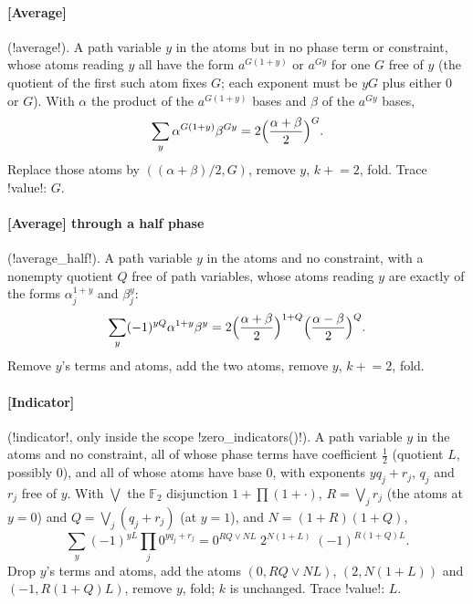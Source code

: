 \paragraph{[Average]} (\code!average!). A path variable $y$ in the atoms but in no phase term or constraint, whose atoms reading $y$ all have the form $a^{G(1+y)}$ or $a^{Gy}$ for one $G$ free of $y$ (the quotient of the first such atom fixes $G$; each exponent must be $yG$ plus either $0$ or $G$). With $\alpha$ the product of the $a^{G(1+y)}$ bases and $\beta$ of the $a^{Gy}$ bases,
\begin{equation}
\sum_y\alpha^{G(1+y)}\beta^{Gy}=2\Bigl(\frac{\alpha+\beta}2\Bigr)^{G}.
\end{equation}
Replace those atoms by $((\alpha+\beta)/2,G)$, remove $y$, $k\mathrel{+}=2$, fold. Trace \code!value!: $G$.

\paragraph{[Average] through a half phase} (\code!average_half!). A path variable $y$ in the atoms and no constraint, with a nonempty quotient $Q$ free of path variables, whose atoms reading $y$ are exactly of the forms $\alpha_j^{1+y}$ and $\beta_j^{y}$:
\begin{equation}
\sum_y(-1)^{yQ}\alpha^{1+y}\beta^{y}=2\Bigl(\frac{\alpha+\beta}2\Bigr)^{1+Q}\Bigl(\frac{\alpha-\beta}2\Bigr)^{Q}.
\end{equation}
Remove $y$'s terms and atoms, add the two atoms, remove $y$, $k\mathrel{+}=2$, fold.

\paragraph{[Indicator]} (\code!indicator!, only inside the scope \py!zero_indicators()!). A path variable $y$ in the atoms and no constraint, all of whose phase terms have coefficient $\tfrac12$ (quotient $L$, possibly $0$), and all of whose atoms have base $0$, with exponents $yq_j+r_j$, $q_j$ and $r_j$ free of $y$. With $\bigvee$ the $\mathbb{F}_2$ disjunction $1+\prod(1+\cdot)$, $R=\bigvee_jr_j$ (the atoms at $y=0$) and $Q=\bigvee_j(q_j+r_j)$ (at $y=1$), and $N=(1+R)(1+Q)$,
\begin{equation}
\sum_y(-1)^{yL}\prod_j0^{yq_j+r_j}=0^{RQ\vee NL}\;2^{N(1+L)}\;(-1)^{R(1+Q)L}.
\end{equation}
Drop $y$'s terms and atoms, add the atoms $(0,RQ\vee NL)$, $(2,N(1+L))$ and $(-1,R(1+Q)L)$, remove $y$, fold; $k$ is unchanged. Trace \code!value!: $L$.

